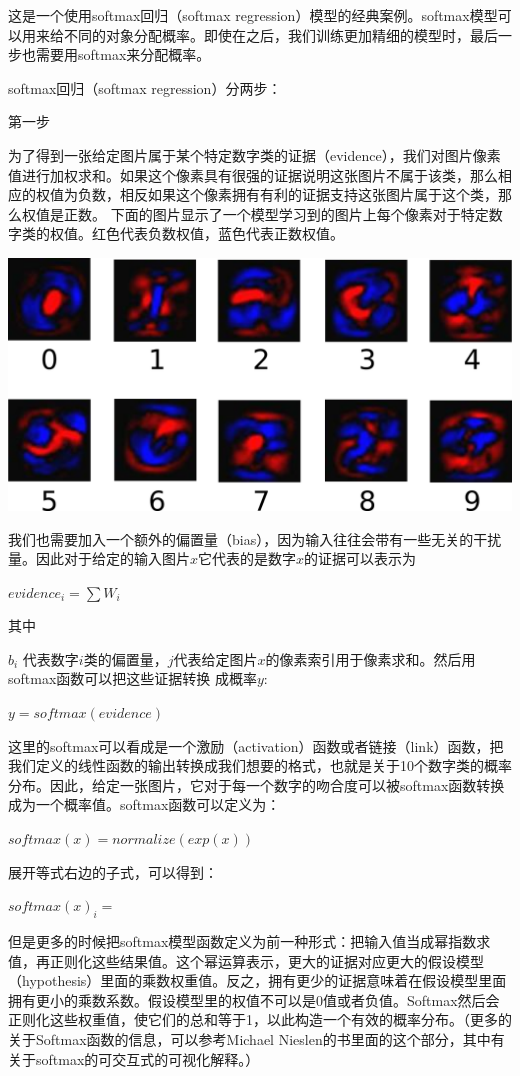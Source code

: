 \documentclass[a4paper,11pt,twoside]{ctexart}
\begin{document}
这是一个使用softmax回归（softmax regression）模型的经典案例。softmax模型可以用来给不同的对象分配概率。即使在之后，我们训练更加精细的模型时，最后一步也需要用softmax来分配概率。

softmax回归（softmax regression）分两步：

第一步

为了得到一张给定图片属于某个特定数字类的证据（evidence），我们对图片像素值进行加权求和。如果这个像素具有很强的证据说明这张图片不属于该类，那么相应的权值为负数，相反如果这个像素拥有有利的证据支持这张图片属于这个类，那么权值是正数。
下面的图片显示了一个模型学习到的图片上每个像素对于特定数字类的权值。红色代表负数权值，蓝色代表正数权值。

\includegraphics[width=.75\textwidth]{../SOURCE/images/softmax-weights.png}

我们也需要加入一个额外的偏置量（bias），因为输入往往会带有一些无关的干扰量。因此对于给定的输入图片$x$它代表的是数字$x$的证据可以表示为

$evidence_i = \sum{W_i}$

其中

$b_i$ 代表数字$i$类的偏置量，$j$代表给定图片$x$的像素索引用于像素求和。然后用softmax函数可以把这些证据转换
成概率$y$:

$y = softmax(evidence)$

这里的softmax可以看成是一个激励（activation）函数或者链接（link）函数，把我们定义的线性函数的输出转换成我们想要的格式，也就是关于10个数字类的概率分布。因此，给定一张图片，它对于每一个数字的吻合度可以被softmax函数转换成为一个概率值。softmax函数可以定义为：

$softmax(x) = normalize(exp(x))$

展开等式右边的子式，可以得到：

$softmax(x)_i = $

但是更多的时候把softmax模型函数定义为前一种形式：把输入值当成幂指数求值，再正则化这些结果值。这个幂运算表示，更大的证据对应更大的假设模型（hypothesis）里面的乘数权重值。反之，拥有更少的证据意味着在假设模型里面拥有更小的乘数系数。假设模型里的权值不可以是0值或者负值。Softmax然后会正则化这些权重值，使它们的总和等于1，以此构造一个有效的概率分布。（更多的关于Softmax函数的信息，可以参考Michael Nieslen的书里面的这个部分，其中有关于softmax的可交互式的可视化解释。）
\end{document}
